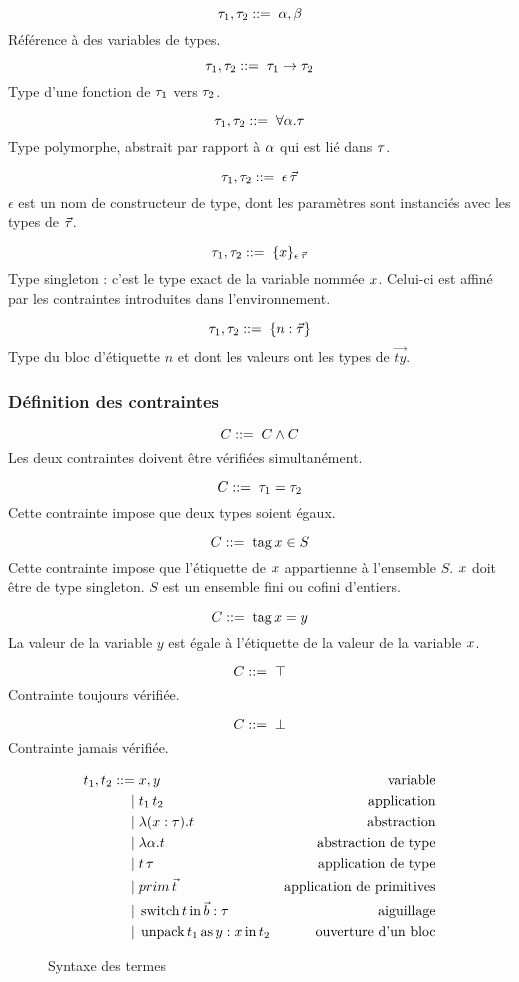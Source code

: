 $$\tau_1, \tau_2 ::= \; \alpha, \beta$$
%
Référence à des variables de types.

$$\tau_1, \tau_2 ::= \;  \tau_1 \rightarrow \tau_2$$
%
Type d'une fonction de $\tau_1$ vers $\tau_2$.

$$\tau_1, \tau_2 ::= \;  \forall \alpha. \tau$$
%
Type polymorphe, abstrait par rapport à $\alpha$ qui est lié dans $\tau$.

$$\tau_1, \tau_2 ::= \;  \epsilon \, \vec{\tau}$$
%
$\epsilon$ est un nom de constructeur de type, dont les paramètres sont
instanciés avec les types de $\vec{\tau}$.

$$\tau_1, \tau_2 ::= \;  \{ x \}_{\epsilon \, \vec{\tau}}$$
%
Type singleton : c'est le type exact de la variable nommée $x$. Celui-ci est
affiné par les contraintes introduites dans l'environnement.

$$\tau_1, \tau_2 ::= \;  \{ n: \vec{\tau} \}$$
%
Type du bloc d'étiquette $n$ et dont les valeurs ont les types de $\vec{ty}$.

\subsubsection{Définition des contraintes}

$$C ::= \; C \wedge C$$
%
Les deux contraintes doivent être vérifiées simultanément.

$$C ::= \;  \tau_1 = \tau_2$$
%
Cette contrainte impose que deux types soient égaux.

$$C ::= \;  \operatorname{tag} x \in S$$
%
Cette contrainte impose que l'étiquette de $x$ appartienne à l'ensemble $S$.
$x$ doit être de type singleton. $S$ est un ensemble fini ou cofini
d'entiers.

$$C ::= \;  \operatorname{tag} x = y$$
%
La valeur de la variable $y$ est égale à l'étiquette de la valeur de la
variable $x$.

$$C ::= \;  \top$$
%
Contrainte toujours vérifiée.

$$C ::= \;  \bot$$
%
Contrainte jamais vérifiée.

\begin{figure}
\begin{align*}
  t_1, t_2 ::=& \; x, y 
    & \text{variable}
  \\ |& \;      t_1 \, t_2
    & \text{application}
  \\ |& \;      \lambda (x : \tau) . t
    & \text{abstraction}
  \\ |& \;      \lambda \alpha . t
    & \text{abstraction de type}
  \\ |& \;      t \, \tau
    & \text{application de type}
  \\ |& \;      prim \, \vec{t}
    & \text{application de primitives}
  \\ |& \;      \operatorname{switch} t \operatorname{in} \vec{b} : \tau
    & \text{aiguillage}
  \\ |& \;      \operatorname{unpack} t_1 \operatorname{as} y : x \operatorname{in} t_2
    & \text{ouverture d'un bloc}
\end{align*}
\caption{Syntaxe des termes}
\end{figure}

